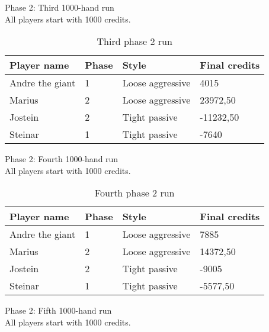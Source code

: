 \documentclass[a4paper, 12pt]{article}
\begin{document}
\begin{center}
	{ \Large Phase 2: Third 1000-hand run } \\
	All players start with 1000 credits.
\end{center}

\begin{table}[H]
	\begin{center}
		\begin{tabular}{|l|l|l| p{6cm} |}
		\hline
		\textbf{Player name} & \textbf{Phase} & \textbf{Style} & \textbf{Final credits} \\
		\hline
		Andre the giant & 1 & Loose aggressive & 4015 \\
		\hline
		Marius & 2 & Loose aggressive & 23972,50 \\
		\hline
		Jostein & 2 & Tight passive & -11232,50 \\
		\hline
		Steinar & 1 & Tight passive & -7640 \\
		\hline
		\end{tabular}
	\end{center}
	\caption{Third phase 2 run}
\end{table}

\begin{center}
	{ \Large Phase 2: Fourth 1000-hand run } \\
	All players start with 1000 credits.
\end{center}

\begin{table}[H]
	\begin{center}
		\begin{tabular}{|l|l|l| p{6cm} |}
		\hline
		\textbf{Player name} & \textbf{Phase} & \textbf{Style} & \textbf{Final credits} \\
		\hline
		Andre the giant & 1 & Loose aggressive & 7885 \\
		\hline
		Marius & 2 & Loose aggressive & 14372,50 \\
		\hline
		Jostein & 2 & Tight passive & -9005 \\
		\hline
		Steinar & 1 & Tight passive & -5577,50 \\
		\hline
		\end{tabular}
	\end{center}
	\caption{Fourth phase 2 run}
\end{table}

\begin{center}
	{ \Large Phase 2: Fifth 1000-hand run } \\
	All players start with 1000 credits.
\end{center}
\end{document}
